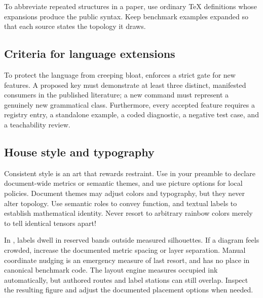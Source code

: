 
To abbreviate repeated structures in a paper, use ordinary \TeX{} definitions
whose expansions produce the public \pkg{} syntax.  Keep benchmark examples
expanded so that each source states the topology it draws.

\subsection{Criteria for language extensions}

To protect the language from creeping bloat, \pkg{} enforces a strict gate for
new features.  A proposed key must demonstrate at least three distinct,
manifested consumers in the published literature; a new command must represent a
genuinely new grammatical class.  Furthermore, every accepted feature requires a
registry entry, a standalone example, a coded diagnostic, a negative test case,
and a teachability review.

\subsection{House style and typography}

Consistent style is an art that rewards restraint.  Use  in your
preamble to declare document-wide metrics or semantic themes, and use picture
options for local policies.  Document themes may adjust colors and typography,
but they never alter topology.  Use semantic roles to convey function, and
textual labels to establish mathematical identity.  Never resort to arbitrary
rainbow colors merely to tell identical tensors apart!

In \pkg{}, labels dwell in reserved bands outside measured silhouettes.  If a
diagram feels crowded, increase the documented metric spacing or layer
separation.  Manual coordinate nudging is an emergency measure of last resort,
and has no place in canonical benchmark code.  The layout engine measures
occupied ink automatically, but authored routes and label stations can still
overlap.  Inspect the resulting figure and adjust the documented placement
options when needed.
